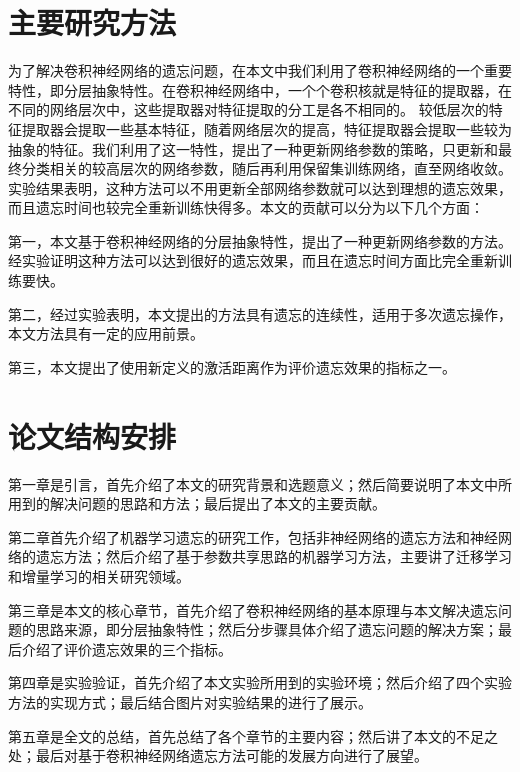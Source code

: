 \section{主要研究方法}
为了解决卷积神经网络的遗忘问题，在本文中我们利用了卷积神经网络的一个重要特性，即分层抽象特性。在卷积神经网络中，一个个卷积核就是特征的提取器，在不同的网络层次中，这些提取器对特征提取的分工是各不相同的。
较低层次的特征提取器会提取一些基本特征，随着网络层次的提高，特征提取器会提取一些较为抽象的特征。我们利用了这一特性，提出了一种更新网络参数的策略，只更新和最终分类相关的较高层次的网络参数，随后再利用保留集训练网络，直至网络收敛。
实验结果表明，这种方法可以不用更新全部网络参数就可以达到理想的遗忘效果，而且遗忘时间也较完全重新训练快得多。本文的贡献可以分为以下几个方面：

第一，本文基于卷积神经网络的分层抽象特性，提出了一种更新网络参数的方法。经实验证明这种方法可以达到很好的遗忘效果，而且在遗忘时间方面比完全重新训练要快。

第二，经过实验表明，本文提出的方法具有遗忘的连续性，适用于多次遗忘操作，本文方法具有一定的应用前景。

第三，本文提出了使用新定义的激活距离作为评价遗忘效果的指标之一。

\section{论文结构安排}
第一章是引言，首先介绍了本文的研究背景和选题意义；然后简要说明了本文中所用到的解决问题的思路和方法；最后提出了本文的主要贡献。

第二章首先介绍了机器学习遗忘的研究工作，包括非神经网络的遗忘方法和神经网络的遗忘方法；然后介绍了基于参数共享思路的机器学习方法，主要讲了迁移学习和增量学习的相关研究领域。

第三章是本文的核心章节，首先介绍了卷积神经网络的基本原理与本文解决遗忘问题的思路来源，即分层抽象特性；然后分步骤具体介绍了遗忘问题的解决方案；最后介绍了评价遗忘效果的三个指标。

第四章是实验验证，首先介绍了本文实验所用到的实验环境；然后介绍了四个实验方法的实现方式；最后结合图片对实验结果的进行了展示。

第五章是全文的总结，首先总结了各个章节的主要内容；然后讲了本文的不足之处；最后对基于卷积神经网络遗忘方法可能的发展方向进行了展望。
